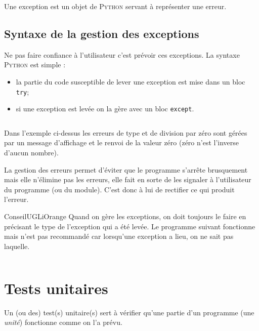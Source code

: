 \documentclass[a4paper,10pt,cours]{nsi}
\newcommand{\file}[1]{\inputminted{python}{#1}}
\begin{document}
\begin{definition}[ : exception]
    Une exception est un objet de \textsc{Python} servant à représenter une erreur.
\end{definition}

\subsection{Syntaxe de la gestion des exceptions}
Ne pas faire confiance à l'utilisateur c'est prévoir ces exceptions. La syntaxe \textsc{Python} est simple :
\begin{itemize}
    \item   la partie du code susceptible de lever une exception est mise dans un bloc \texttt{try};
    \item   si une exception est levée on la gère avec un bloc \texttt{except}.
\end{itemize}

\begin{pyc}
    \file{scripts/fonction1.py}
\end{pyc}
Dans l'exemple ci-dessus les erreurs de type et de division par zéro sont gérées par un message d'affichage et le renvoi de la valeur zéro (zéro n'est l'inverse d'aucun nombre).

\begin{remarque}[]
    La gestion des erreurs permet d'éviter que le programme s'arrête brusquement mais elle n'élimine pas les erreurs, elle fait en sorte de les signaler à l'utilisateur du programme (ou du module). C'est donc à lui de rectifier ce qui produit l'erreur.
\end{remarque}

\begin{encadrecolore}{Conseil}{UGLiOrange}
    Quand on gère les exceptions, on doit toujours le faire en précisant le type de l'exception qui a été levée. Le programme suivant fonctionne mais n'est pas recommandé car lorsqu'une exception a lieu, on ne sait pas laquelle.
    \inputminted{python}{scripts/fonction2.py}
\end{encadrecolore}


\section{Tests unitaires}

\begin{definition}
    Un (ou des) test(s) unitaire(s) sert à vérifier qu'une partie d'un programme (une \textit{unité}) fonctionne comme on l'a prévu.
\end{definition}
\end{document}
